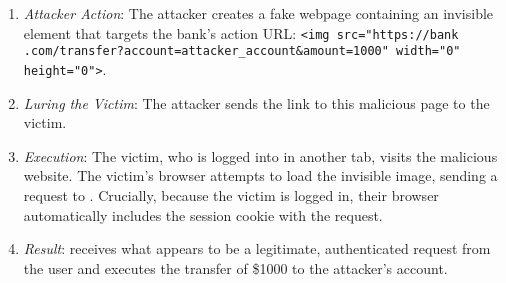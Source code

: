 \begin{enumerate}
    \item \textit{Attacker Action}: The attacker creates a fake webpage  containing an invisible element that targets the bank's action URL: \texttt{<img src="https://bank .com/transfer?account=attacker\_account\&amount=1000" width="0" height="0">}.
    \item \textit{Luring the Victim}: The attacker sends the link to this malicious page to the victim.
    \item \textit{Execution}: The victim, who is logged into  in another tab, visits the malicious website. The victim's browser attempts to load the invisible image, sending a request to . Crucially, because the victim is logged in, their browser automatically includes the session cookie with the request.
    \item \textit{Result}:  receives what appears to be a legitimate, authenticated request from the user and executes the transfer of \$1000 to the attacker's account.
\end{enumerate}